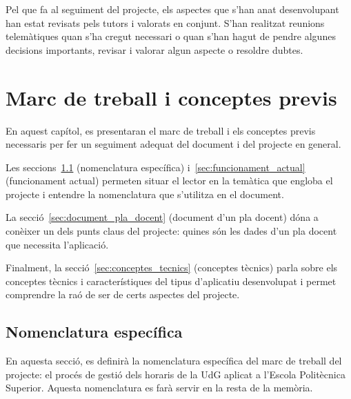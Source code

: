 \documentclass[a4paper,12pt]{ThesisStyle}
\begin{document}
Pel que fa al seguiment del projecte, els aspectes que s'han anat desenvolupant han estat revisats pels tutors i valorats en conjunt. S'han realitzat reunions telemàtiques quan s'ha cregut necessari o quan s'han hagut de pendre algunes decisions importants, revisar i valorar algun aspecte o resoldre dubtes.


\chapter{Marc de treball i conceptes previs}
\label{cap:marcdetreball}

En aquest capítol, es presentaran el marc de treball i els conceptes previs necessaris per fer un seguiment adequat del document i del projecte en general.

Les seccions~\ref{sec:nomenclatura} (nomenclatura específica) i~\ref{sec:funcionament_actual} (funcionament actual) permeten situar el lector en la temàtica que engloba el projecte i entendre la nomenclatura que s'utilitza en el document.

La secció~\ref{sec:document_pla_docent} (document d'un pla docent) dóna a conèixer un dels punts claus del projecte: quines són les dades d'un pla docent que necessita l'aplicació.

Finalment, la secció~\ref{sec:conceptes_tecnics} (conceptes tècnics) parla sobre els conceptes tècnics i característiques del tipus d'aplicatiu desenvolupat i permet comprendre la raó de ser de certs aspectes del projecte.

\section{Nomenclatura específica}
\label{sec:nomenclatura}

En aquesta secció, es definirà la nomenclatura específica del marc de treball del projecte: el procés de gestió dels horaris de la UdG aplicat a l'Escola Politècnica Superior. Aquesta nomenclatura es farà servir en la resta de la memòria.
\end{document}
